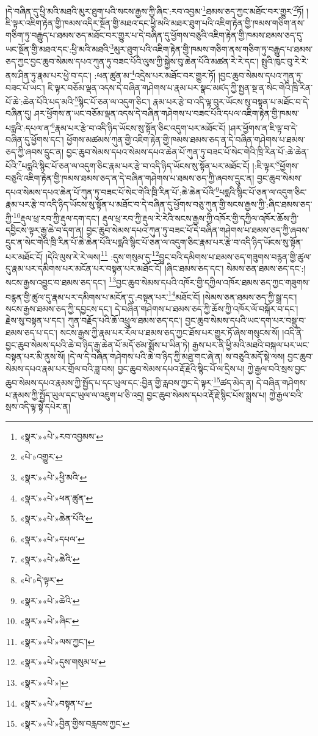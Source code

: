 །དེ་བཞིན་དུ་ཕྱི་མའི་མཐའི་མུར་ཐུག་པའི་སངས་རྒྱས་ཀྱི་ཞིང་:རབ་འབྱམ་\footnote{«སྣར་»«པེ་»རབ་འབྱམས་}ཐམས་ཅད་ཀྱང་མཐོང་བར་གྱུར་\footnote{«པེ་»འགྱུར་}ཏོ། །ཇི་ལྟར་འཇིག་རྟེན་གྱི་ཁམས་འདིར་སྔོན་གྱི་མཐའ་དང་ཕྱི་མའི་མཐར་ཐུག་པའི་འཇིག་རྟེན་གྱི་ཁམས་གཅིག་ནས་གཅིག་ཏུ་བརྒྱུད་པ་ཐམས་ཅད་མཐོང་བར་གྱུར་པ་དེ་བཞིན་དུ་ཕྱོགས་བཅུའི་འཇིག་རྟེན་གྱི་ཁམས་ཐམས་ཅད་དུ་ཡང་སྔོན་གྱི་མཐའ་དང་:ཕྱི་མའི་མཐའི་\footnote{«སྣར་»«པེ་»ཕྱི་མའི་}མུར་ཐུག་པའི་འཇིག་རྟེན་གྱི་ཁམས་གཅིག་ནས་གཅིག་ཏུ་བརྒྱུད་པ་ཐམས་ཅད་ཀྱང་བྱང་ཆུབ་སེམས་དཔའ་ཀུན་ཏུ་བཟང་པོའི་ལུས་ཀྱི་སྐྱེས་བུ་ཆེན་པོའི་མཚན་རེ་རེ་དང་། སྤུའི་ཁུང་བུ་རེ་རེ་ནས་ཤིན་ཏུ་རྣམ་པར་ཕྱེ་བ་དང་། :ཕན་ཚུན་མ་\footnote{«སྣར་»«པེ་»ཕན་ཚུན་}འདྲེས་པར་མཐོང་བར་གྱུར་ཏོ། །བྱང་ཆུབ་སེམས་དཔའ་ཀུན་ཏུ་བཟང་པོ་ཡང་། ཇི་ལྟར་བཅོམ་ལྡན་འདས་དེ་བཞིན་གཤེགས་པ་རྣམ་པར་སྣང་མཛད་ཀྱི་སྤྱན་སྔ་ན་སེང་གེའི་ཁྲི་རིན་པོ་ཆེ་:ཆེན་པོའི་པད་མའི་\footnote{«སྣར་»«པེ་»ཆེན་པོའི་}སྙིང་པོ་ཅན་ལ་འདུག་ཅིང་། རྣམ་པར་རྩེ་བ་འདི་ལྟ་བུར་ཡོངས་སུ་བསྟན་པ་མཐོང་བ་དེ་བཞིན་དུ། ཤར་ཕྱོགས་ན་ཡང་བཅོམ་ལྡན་འདས་དེ་བཞིན་གཤེགས་པ་བཟང་པོའི་དཔལ་འཇིག་རྟེན་གྱི་ཁམས་པདྨའི་:དཔལ་ན་\footnote{«སྣར་»«པེ་»དཔལ་}རྣམ་པར་རྩེ་བ་འདི་ཉིད་ཡོངས་སུ་སྟོན་ཅིང་འདུག་པར་མཐོང་ངོ། །ཤར་ཕྱོགས་ན་ཇི་ལྟ་བ་དེ་བཞིན་དུ་ཕྱོགས་དང་། ཕྱོགས་མཚམས་ཀུན་གྱི་འཇིག་རྟེན་གྱི་ཁམས་ཐམས་ཅད་ན་དེ་བཞིན་གཤེགས་པ་ཐམས་ཅད་ཀྱི་ཞབས་དྲུང་ན། བྱང་ཆུབ་སེམས་དཔའ་སེམས་དཔའ་ཆེན་པོ་ཀུན་ཏུ་བཟང་པོ་སེང་གེའི་ཁྲི་རིན་པོ་:ཆེ་ཆེན་པོའི་\footnote{«སྣར་»«པེ་»ཆེའི་}པདྨའི་སྙིང་པོ་ཅན་ལ་འདུག་ཅིང་རྣམ་པར་རྩེ་བ་འདི་ཉིད་ཡོངས་སུ་སྟོན་པར་མཐོང་ངོ། །:ཇི་ལྟར་\footnote{«པེ་»དེ་ལྟར་}ཕྱོགས་བཅུའི་འཇིག་རྟེན་གྱི་ཁམས་ཐམས་ཅད་ན་དེ་བཞིན་གཤེགས་པ་ཐམས་ཅད་ཀྱི་ཞབས་དྲུང་ན། བྱང་ཆུབ་སེམས་དཔའ་སེམས་དཔའ་ཆེན་པོ་ཀུན་ཏུ་བཟང་པོ་སེང་གེའི་ཁྲི་རིན་པོ་:ཆེ་ཆེན་པོའི་\footnote{«སྣར་»«པེ་»ཆེའི་}པདྨའི་སྙིང་པོ་ཅན་ལ་འདུག་ཅིང་རྣམ་པར་རྩེ་བ་འདི་ཉིད་ཡོངས་སུ་སྟོན་པ་མཐོང་བ་དེ་བཞིན་དུ་ཕྱོགས་བཅུ་ཀུན་གྱི་སངས་རྒྱས་ཀྱི་:ཞིང་ཐམས་ཅད་ཀྱི་\footnote{«སྣར་»«པེ་»ཞིང་}རྡུལ་ཕྲ་རབ་ཀྱི་རྡུལ་དག་དང་། རྡུལ་ཕྲ་རབ་ཀྱི་རྡུལ་རེ་རེའི་སངས་རྒྱས་ཀྱི་འཁོར་གྱི་དཀྱིལ་འཁོར་ཆོས་ཀྱི་དབྱིངས་ལྟར་རྒྱ་ཆེ་བ་དག་ན། བྱང་ཆུབ་སེམས་དཔའ་ཀུན་ཏུ་བཟང་པོ་དེ་བཞིན་གཤེགས་པ་ཐམས་ཅད་ཀྱི་ཞབས་དྲུང་ན་སེང་གེའི་ཁྲི་རིན་པོ་ཆེ་ཆེན་པོའི་པདྨའི་སྙིང་པོ་ཅན་ལ་འདུག་ཅིང་རྣམ་པར་རྩེ་བ་འདི་ཉིད་ཡོངས་སུ་སྟོན་པར་མཐོང་ངོ། །དེའི་ལུས་རེ་རེ་ལས།\footnote{«སྣར་»«པེ་»ལས་ཀྱང་།} :དུས་གསུམ་དུ་\footnote{«སྣར་»«པེ་»དུས་གསུམ་པ་}བྱུང་བའི་དམིགས་པ་ཐམས་ཅད་གཟུགས་བརྙན་གྱི་ཚུལ་དུ་རྣམ་པར་དམིགས་པར་མངོན་པར་བསྟན་པར་མཐོང་ངོ། །ཞིང་ཐམས་ཅད་དང་། སེམས་ཅན་ཐམས་ཅད་དང་:།སངས་རྒྱས་འབྱུང་བ་ཐམས་ཅད་དང་། \footnote{«སྣར་»«པེ་»། }བྱང་ཆུབ་སེམས་དཔའི་འཁོར་གྱི་དཀྱིལ་འཁོར་ཐམས་ཅད་ཀྱང་གཟུགས་བརྙན་གྱི་ཚུལ་དུ་རྣམ་པར་དམིགས་པ་མངོན་དུ་:བསྟན་པར་\footnote{«སྣར་»«པེ་»བསྟན་པ་}མཐོང་ངོ། །སེམས་ཅན་ཐམས་ཅད་ཀྱི་སྒྲ་དང་། སངས་རྒྱས་ཐམས་ཅད་ཀྱི་དབྱངས་དང་། དེ་བཞིན་གཤེགས་པ་ཐམས་ཅད་ཀྱི་ཆོས་ཀྱི་འཁོར་ལོ་བསྐོར་བ་དང་། རྗེས་སུ་བསྟན་པ་དང་། ཀུན་བརྗོད་པའི་ཆོ་འཕྲུལ་ཐམས་ཅད་དང་། བྱང་ཆུབ་སེམས་དཔའི་ཡང་དག་པར་བསྡུ་བ་ཐམས་ཅད་པ་དང་། སངས་རྒྱས་ཀྱི་རྣམ་པར་རོལ་པ་ཐམས་ཅད་ཀྱང་ཐོས་པར་གྱུར་ཏོ་ཞེས་གསུངས་སོ། །འདི་ནི་བྱང་ཆུབ་སེམས་དཔའི་ཆེ་བ་ཉིད་རྒྱ་ཆེན་པོ་མདོ་ཙམ་སྨོས་པ་ཡིན་ཏེ། རྒྱས་པར་ནི་ཕྱི་མའི་མཐའི་བསྐལ་པར་ཡང་བསྟན་པར་མི་ནུས་སོ། །དེ་ལ་དེ་བཞིན་གཤེགས་པའི་ཆེ་བ་ཉིད་ཀྱི་མཐུ་གང་ཞེ་ན། ས་བཅུའི་མདོ་སྡེ་ལས། བྱང་ཆུབ་སེམས་དཔའ་རྣམ་པར་གྲོལ་བའི་ཟླ་བས། བྱང་ཆུབ་སེམས་དཔའ་རྡོ་རྗེའི་སྙིང་པོ་ལ་དྲིས་པ། ཀྱེ་རྒྱལ་བའི་སྲས་བྱང་ཆུབ་སེམས་དཔའ་རྣམས་ཀྱི་སྤྱོད་པ་དང་ཡུལ་དང་:བྱིན་གྱི་རླབས་ཀྱང་དེ་ལྟར་\footnote{«སྣར་»«པེ་»བྱིན་གྱིས་བརླབས་ཀྱང་}ཚད་མེད་ན། དེ་བཞིན་གཤེགས་པ་རྣམས་ཀྱི་སྤྱོད་ཡུལ་དང་ཡུལ་ལ་འཇུག་པ་ཅི་འདྲ། བྱང་ཆུབ་སེམས་དཔའ་རྡོ་རྗེ་སྙིང་པོས་སྨྲས་པ། ཀྱེ་རྒྱལ་བའི་སྲས་འདི་ལྟ་སྟེ་དཔེར་ན། 